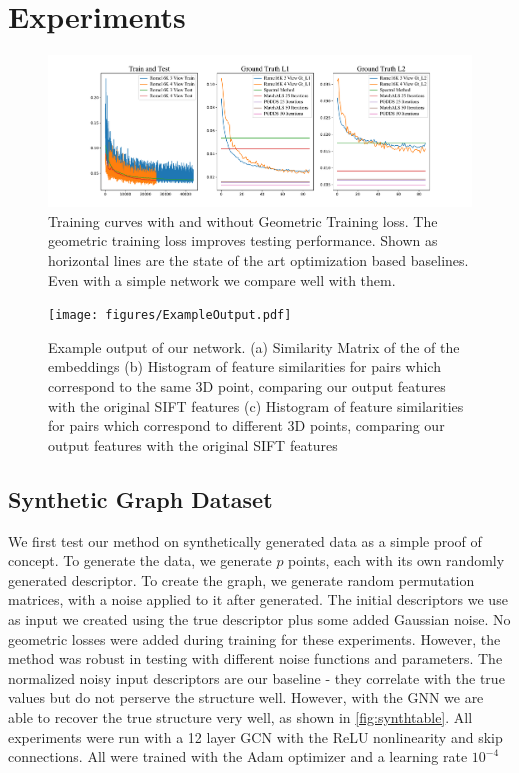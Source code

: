 \documentclass[10pt,twocolumn,letterpaper]{article}
\begin{document}
\section{Experiments}

\begin{figure}
\begin{center}
  \includegraphics[width=0.8\linewidth]{figures/TrainingCurves.pdf}
  \end{center}
    \caption{
      Training curves with and without Geometric Training loss.
      The geometric training loss improves testing performance.
      Shown as horizontal lines are the state of the art optimization based baselines.
      Even with a simple network we compare well with them.
    }
  \label{fig:short}
\end{figure}


\begin{figure}
\begin{center}
  \texttt{[image: figures/ExampleOutput.pdf]}
  \end{center}
     \caption{Example output of our network. (a) Similarity Matrix of the of the embeddings (b) Histogram of feature similarities for pairs which correspond to the same 3D point, comparing our output features with the original SIFT features (c) Histogram of feature similarities for pairs which correspond to different 3D points, comparing our output features with the original SIFT features}
  \label{fig:short}
\end{figure}
\subsection{Synthetic Graph Dataset}
We first test our method on synthetically generated data as a simple proof of concept.
To generate the data, we generate $p$ points, each with its own randomly generated descriptor.
To create the graph, we generate random permutation matrices, with a noise applied to it after generated.
The initial descriptors we use as input we created using the true descriptor plus some added Gaussian noise.
No geometric losses were added during training for these experiments.
However, the method was robust in testing with different noise functions and parameters.
The normalized noisy input descriptors are our baseline - they correlate with the true values but do not perserve the structure well.
However, with the GNN we are able to recover the true structure very well, as shown in \ref{fig:synthtable}.
All experiments were run with a 12 layer GCN with the ReLU nonlinearity and skip connections.
All were trained with the Adam optimizer \cite{kingma2014adam} and a learning rate $10^{-4}$
\end{document}
